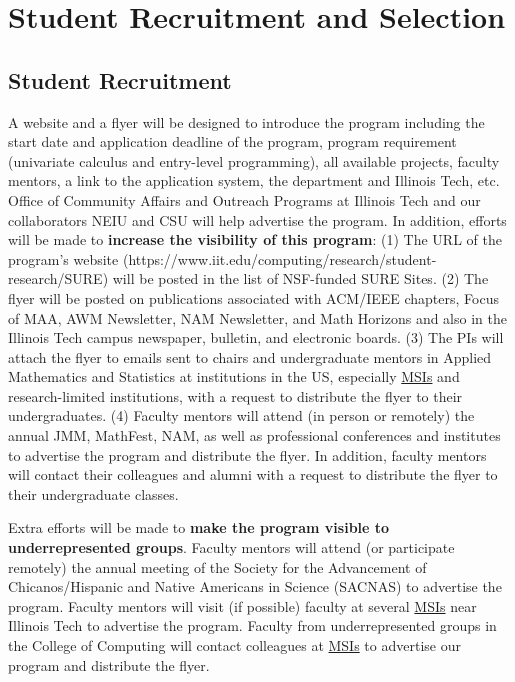 \documentclass[11pt]{NSFamsart}
\newcommand{\MSIs}{\hyperlink{MSIlink}{MSIs}\xspace}
\begin{document}
\section{Student Recruitment and Selection}
\subsection{Student Recruitment} A website and a flyer will be designed to introduce the program including the start date and application deadline of the program, program requirement (univariate calculus and entry-level programming),  
all available projects, faculty mentors, a link to the application system, the department
and Illinois Tech, etc. Office of Community Affairs and Outreach Programs at Illinois Tech and our collaborators NEIU and CSU will help advertise the program. In addition,
efforts will be made to 
\textbf{increase the visibility of this program}: 
(1) 
The URL of the program’s
website (https://www.iit.edu/computing/research/student-research/SURE) will be posted in the list of NSF-funded SURE Sites.
(2) The flyer will be posted on publications associated with ACM/IEEE chapters, Focus of MAA, AWM
Newsletter, NAM Newsletter, and Math Horizons and also in the Illinois Tech campus newspaper, bulletin, and electronic boards.
(3) 
The PIs will attach the flyer to emails sent to
chairs and undergraduate mentors in Applied Mathematics and Statistics at institutions in the US, especially
\MSIs and research-limited institutions, with a request to distribute the flyer to their undergraduates. 
(4) Faculty mentors will attend (in person or remotely)
the annual JMM, MathFest, NAM, as well as professional conferences and institutes to advertise the
program and distribute the flyer. In addition, faculty mentors will contact their colleagues and alumni with a request to
distribute the flyer to their undergraduate classes.

Extra efforts will be made to 
\textbf{make the program visible to underrepresented groups}.
Faculty mentors will attend (or participate remotely) the annual meeting of the Society for the Advancement of Chicanos/Hispanic and Native Americans in Science  (SACNAS)
to advertise the program.
Faculty mentors will visit (if possible) faculty at several
\MSIs near Illinois Tech to advertise the program.
 Faculty from underrepresented groups in the College of Computing will contact colleagues at \MSIs to advertise our
 program and distribute the flyer.
 
\end{document}
